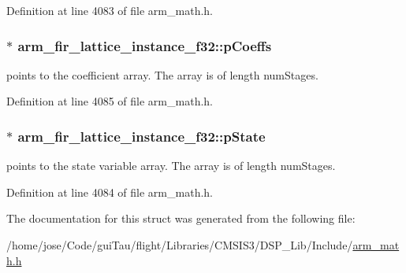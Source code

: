 Definition at line 4083 of file arm\-\_\-math.\-h.

\hypertarget{structarm__fir__lattice__instance__f32_a33bf5948c947f9ef80a99717cb0a0a43}{
\subsubsection[{p\-Coeffs}]{$\ast$ arm\-\_\-fir\-\_\-lattice\-\_\-instance\-\_\-f32\-::p\-Coeffs}}\label{structarm__fir__lattice__instance__f32_a33bf5948c947f9ef80a99717cb0a0a43}
points to the coefficient array. The array is of length num\-Stages. 

Definition at line 4085 of file arm\-\_\-math.\-h.

\hypertarget{structarm__fir__lattice__instance__f32_ae348884a1ba9b83fadccd5da640cbcaf}{
\subsubsection[{p\-State}]{$\ast$ arm\-\_\-fir\-\_\-lattice\-\_\-instance\-\_\-f32\-::p\-State}}\label{structarm__fir__lattice__instance__f32_ae348884a1ba9b83fadccd5da640cbcaf}
points to the state variable array. The array is of length num\-Stages. 

Definition at line 4084 of file arm\-\_\-math.\-h.



The documentation for this struct was generated from the following file\-:\begin{DoxyCompactItemize}
\item 
/home/jose/\-Code/gui\-Tau/flight/\-Libraries/\-C\-M\-S\-I\-S3/\-D\-S\-P\-\_\-\-Lib/\-Include/\hyperlink{arm__math_8h}{arm\-\_\-math.\-h}\end{DoxyCompactItemize}
